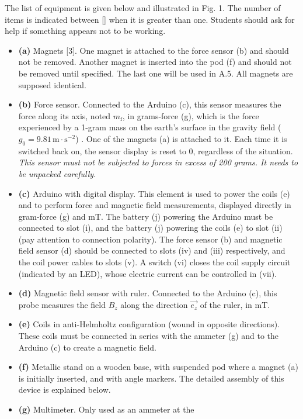 The list of equipment is given below and illustrated in Fig. 1. The number of
items is indicated between [] when it is greater than one. Students should ask
for help if something appears not to be working.
\begin{itemize}
\item \textbf{(a)} Magnets [3]. One magnet is attached to the force sensor (b)
and should not be removed. Another magnet is inserted into the pod (f) and
should not be removed until specified. The last one will be used in A.5. All
magnets are supposed identical.
\item \textbf{(b)} Force sensor. Connected to the Arduino (c), this sensor
measures the force along its axis, noted $m_\mathrm{f}$, in grams-force (\textquotedbl g\textquotedbl),
which is the force experienced by a 1-gram mass on the earth's surface in the
gravity field ($g_0 = 9.81\,\mathrm{m\cdot s^{-2}}$) . One of the magnets (a)
is attached to it. Each time it is switched back on, the sensor display is
reset to 0, regardless of the situation. \textit{This sensor must not be
subjected to forces in excess of 200 grams. It needs to be unpacked
carefully.}
\item \textbf{(c)} Arduino with digital display. This element is used to power
the coils (e) and to perform force and magnetic field measurements, displayed
directly in gram-force (\textquotedbl g\textquotedbl) and mT. The battery (j) powering the Arduino must
be connected to slot (i), and the battery (j) powering the coils (e) to slot
(ii) (pay attention to connection polarity). The force sensor (b) and magnetic
field sensor (d) should be connected to slots (iv) and (iii) respectively, and
the coil power cables to slots (v). A switch (vi) closes the coil supply
circuit (indicated by an LED), whose electric current can be controlled in
(vii).
\item \textbf{(d)} Magnetic field sensor with ruler. Connected to the Arduino
(c), this probe measures the field $B_z$ along the direction
$\overrightarrow{e_z}$ of the ruler, in mT.
\item \textbf{(e)} Coils in anti-Helmholtz configuration (wound in opposite
directions). These coils must be connected in series with the ammeter (g) and
to the Arduino (c) to create a magnetic field.
\item \textbf{(f)} Metallic stand on a wooden base, with suspended pod where a
magnet (a) is initially inserted, and with angle markers. The detailed assembly
of this device is explained below.
\item \textbf{(g)} Multimeter. Only used as an ammeter at the

\end{itemize}
